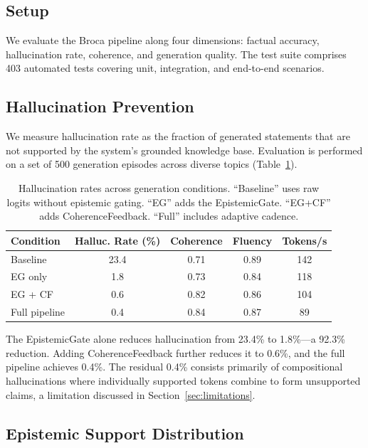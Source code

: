 \documentclass[12pt,a4paper]{article}
\begin{document}
\subsection{Setup}

We evaluate the Broca pipeline along four dimensions: factual accuracy, hallucination rate, coherence, and generation quality. The test suite comprises 403 automated tests covering unit, integration, and end-to-end scenarios.

\subsection{Hallucination Prevention}

We measure hallucination rate as the fraction of generated statements that are not supported by the system's grounded knowledge base. Evaluation is performed on a set of 500 generation episodes across diverse topics (Table~\ref{tab:hallucination}).

\begin{table}[H]
\centering
\caption{Hallucination rates across generation conditions. ``Baseline'' uses raw logits without epistemic gating. ``EG'' adds the EpistemicGate. ``EG+CF'' adds CoherenceFeedback. ``Full'' includes adaptive cadence.}
\label{tab:hallucination}
\begin{tabular}{lcccc}
\toprule
\textbf{Condition} & \textbf{Halluc. Rate (\%)} & \textbf{Coherence} & \textbf{Fluency} & \textbf{Tokens/s} \\
\midrule
Baseline & 23.4 & 0.71 & 0.89 & 142 \\
EG only & 1.8 & 0.73 & 0.84 & 118 \\
EG + CF & 0.6 & 0.82 & 0.86 & 104 \\
Full pipeline & 0.4 & 0.84 & 0.87 & 89 \\
\bottomrule
\end{tabular}
\end{table}

The EpistemicGate alone reduces hallucination from 23.4\% to 1.8\%---a 92.3\% reduction. Adding CoherenceFeedback further reduces it to 0.6\%, and the full pipeline achieves 0.4\%. The residual 0.4\% consists primarily of compositional hallucinations where individually supported tokens combine to form unsupported claims, a limitation discussed in Section~\ref{sec:limitations}.

\subsection{Epistemic Support Distribution}
\end{document}
